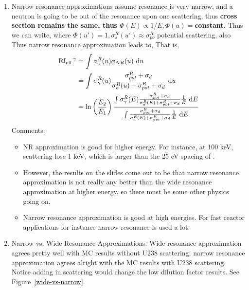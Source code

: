 \documentclass{school-22.211-notes}
\begin{document}
\begin{enumerate}
\item Narrow resonance approximations assume resonance is very narrow, and a neutron is going to be out of the resonance upon one scattering, thus \textbf{cross section remains the same, thus $\Phi(E) \propto 1/E, \Phi(u) = $constant.} Thus we can write, 
where $\Phi(u') = 1, \sigma_{s}^R (u')\approx \sigma_{po}^R$ potential scattering, also 
Thus narrow resonance approximation leads to, 
That is, 
\begin{align}
\left. \mathrm{RI}_{\mathrm{eff}} \right.^{\gamma} &= \int \sigma_{\gamma}^R (u) \phi_{NR} (u) \mbox{ }\mathrm{d} u \\
&= \int \sigma_{\gamma}^R (u) \frac{\sigma_{pot}^R + \sigma_d}{\sigma_a^R(u) + \sigma_{pot}^R + \sigma_d} \mbox{ }\mathrm{d} u \\
&= \ln\left( \frac{E_2}{E_1} \right) \frac{ \int \sigma_{\gamma}^R (E) \frac{\sigma_{pot}^R + \sigma_d}{\sigma_{a}^R(E) + \sigma_{pot}^R + \sigma_d} \frac{1}{E} \mbox{ }\mathrm{d} E}{ \int \frac{\sigma_{pot}^R + \sigma_d}{\sigma_{a}^R(E) + \sigma_{pot}^R + \sigma_d} \frac{1}{E} \mbox{ }\mathrm{d} E}
\end{align}
Comments:
\begin{itemize}
\item NR approximation is good for higher energy. For instance, at 100 keV, scattering lose 1 keV, which is larger than the 25 eV spacing of . 

\item However, the results on the slides come out to be that narrow resonance approximation is not really any better than the wide resonance approximation at higher energy, so there must be some other physics going on. 

\item Narrow resonance approximation is good at high energies. For fast reactor applications for instance narrow resonance is used a lot. 
\end{itemize}

\item Narrow vs. Wide Resonance Approximations\label{narrow-wide-compr}. 
Wide resonance approximation agrees pretty well with MC results without U238 scattering; narrow resonance approximation agrees alright with the MC results with U238 scattering. Notice adding in scattering would change the low dilution factor results. See Figure~\ref{wide-vs-narrow}.


\end{enumerate}
\end{document}
